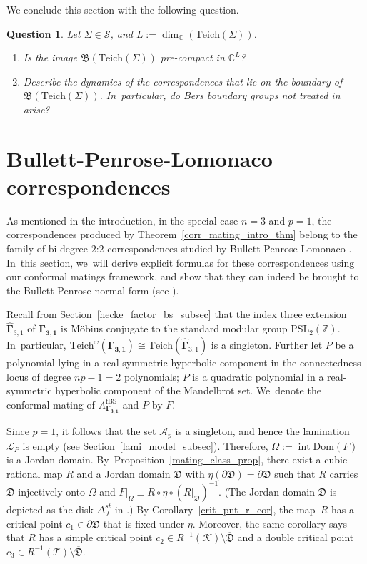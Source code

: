 \documentclass[JEP,XML,SOM,Unicode,NoFloatCountersInSection,published]{cedram}
\newtheorem{question}[lemma]{Question}
\theoremstyle{definition}
\theoremstyle{remark}
\newcommand{\C}{\mathbb{C}}
\newcommand{\Z}{\mathbb{Z}}
\newcommand{\cS}{\mathcal{S}}
\newcommand{\cT}{\mathcal{T}}
\newcommand{\cK}{\mathcal{K}}
\DeclareMathOperator{\Int}{int}
\begin{document}
We conclude this section with the following question.

\begin{question}
Let $\Sigma\in\cS$, and $L:=\dim_{\C}(\mathrm{Teich}(\Sigma))$.
\begin{enumerate}
\item Is the image $\mathfrak{B}(\mathrm{Teich}(\Sigma))$ pre-compact in $\C^{L}$?
\item Describe the dynamics of the correspondences that lie on the boundary of $\mathfrak{B}(\mathrm{Teich}(\Sigma))$. In~particular, do Bers boundary groups not treated in \cite[\S 7]{MM1} arise?
\end{enumerate}
\end{question}

\section{Bullett-Penrose-Lomonaco correspondences}\label{bp_corr_sec}

As mentioned in the introduction, in the special case $n=3$ and $p=1$, the correspondences produced by Theorem~\ref{corr_mating_intro_thm} belong to the family of bi-degree $2$:$2$ correspondences studied by Bullett-Penrose-Lomonaco \cite{BP94,BL20a,BL20b,BL22}. In~this section, we~will derive explicit formulas for these correspondences using our conformal matings framework, and show that they can indeed be brought to the Bullett-Penrose normal form (see \cite[Eq.\,1.1]{BP94}).

Recall from Section~\ref{hecke_factor_bs_subsec} that the index three extension $\widehat{\pmb{\Gamma}}_{3,1}$ of $\pmb{\Gamma_{3,1}}$ is Möbius conjugate to the standard modular group $\text{PSL}_2(\Z)$. In~particular, $\mathrm{Teich}^\omega(\pmb{\Gamma_{3,1}})\cong\mathrm{Teich}(\widehat{\pmb{\Gamma}}_{3,1})$ is a singleton. Further let $P$ be a polynomial lying in a real-symmetric hyperbolic component in the connectedness locus of degree $np-1=2$ polynomials; \ie $P$ is a quadratic polynomial in a real-symmetric hyperbolic component of the Mandelbrot set. We~denote the conformal mating of $A_{\pmb{\Gamma_{3,1}}}^{\mathrm{fBS}}$ and $P$ by $F$.

Since $p=1$, it follows that the set $\mathcal{A}_p$ is a singleton, and hence the lamination~$\mathcal{L}_P$ is empty (see Section~\ref{lami_model_subsec}). Therefore, $\Omega:=\Int{\mathrm{Dom}(F)}$ is a Jordan domain. By~Proposition~\ref{mating_class_prop}, there exist a cubic rational map $R$ and a Jordan domain $\mathfrak{D}$ with $\eta(\partial\mathfrak{D})=\partial\mathfrak{D}$ such that $R$ carries $\mathfrak{D}$ injectively onto $\Omega$ and $F\vert_{\Omega}\equiv R\circ\eta\circ (R\vert_{\mathfrak{D}})^{-1}$. (The Jordan domain $\mathfrak{D}$ is depicted as the disk $\Delta_J^{st}$ in \cite[Fig.\,4]{BL20b}.) By Corollary~\ref{crit_pnt_r_cor}, the map~$R$ has a critical point $c_1\in\partial\mathfrak{D}$ that is fixed under $\eta$. Moreover, the same corollary says that $R$ has a simple critical point $c_2\in R^{-1}(\cK)\setminus\overline{\mathfrak{D}}$ and a double critical point $c_3\in R^{-1}(\cT)\setminus\overline{\mathfrak{D}}$.
\end{document}
